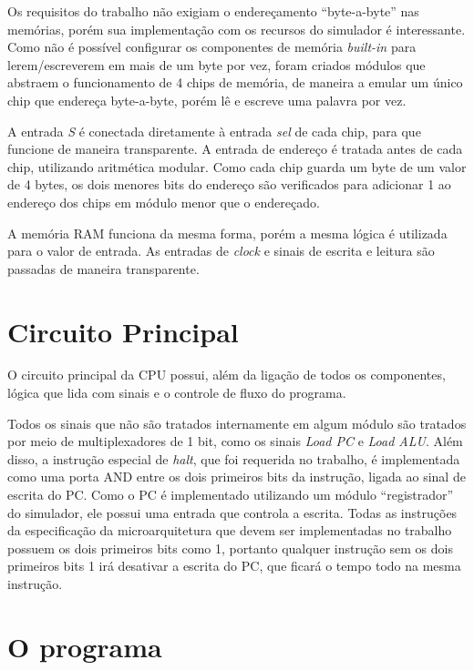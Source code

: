 \documentclass[twocolumn]{article}
\newcommand{\circuit}[1]{}
\begin{document}
Os requisitos do trabalho não exigiam o endereçamento ``byte-a-byte'' nas
memórias, porém sua implementação com os recursos do simulador é
interessante. Como não é possível configurar os componentes de memória
\textit{built-in} para lerem/escreverem em mais de um byte por vez, foram
criados módulos que abstraem o funcionamento de 4 chips de memória, de maneira a
emular um único chip que endereça byte-a-byte, porém lê e escreve uma palavra
por vez.

\circuit{rom}

A entrada \textit{S} é conectada diretamente à entrada \textit{sel} de cada
chip, para que funcione de maneira transparente. A entrada de endereço é tratada
antes de cada chip, utilizando aritmética modular. Como cada chip guarda um byte
de um valor de 4 bytes, os dois menores bits do endereço são verificados para
adicionar 1 ao endereço dos chips em módulo menor que o endereçado.

\circuit{ram}

A memória RAM funciona da mesma forma, porém a mesma lógica é utilizada para o
valor de entrada. As entradas de \textit{clock} e sinais de escrita e leitura
são passadas de maneira transparente.

\section{Circuito Principal}

O circuito principal da CPU possui, além da ligação de todos os componentes,
lógica que lida com sinais e o controle de fluxo do programa.

\circuit{cpu-copy}

Todos os sinais que não são tratados internamente em algum módulo são tratados
por meio de multiplexadores de 1 bit, como os sinais \textit{Load PC} e
\textit{Load ALU}. Além disso, a instrução especial de \textit{halt}, que foi
requerida no trabalho, é implementada como uma porta AND entre os dois primeiros
bits da instrução, ligada ao sinal de escrita do PC. Como o PC é implementado
utilizando um módulo ``registrador'' do simulador, ele possui uma entrada que
controla a escrita. Todas as instruções da especificação da microarquitetura que
devem ser implementadas no trabalho possuem os dois primeiros bits como 1,
portanto qualquer instrução sem os dois primeiros bits 1 irá desativar a escrita
do PC, que ficará o tempo todo na mesma instrução.

\section{O programa}
\end{document}
